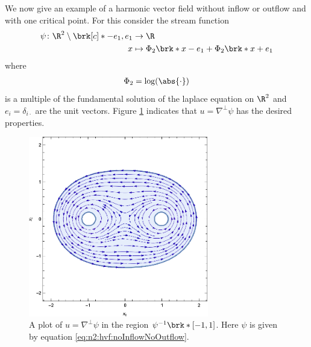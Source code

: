 We now give an example of a harmonic vector field without 
inflow or outflow and with one critical point.
For this consider the stream function
\begin{equation}
  \begin{aligned}
  \psi\colon\R^2\setminus\brk[c]*{-e_1,e_1}&\to\R \\
  x&\mapsto\Phi_2\brk*{x-e_1}+\Phi_2\brk*{x+e_1}
  \end{aligned}\label{eq:n2:hvf:noInflowNoOutflow}
\end{equation}
where
\begin{align*}
  \Phi_2=\log(\abs{\cdot})
\end{align*}
is a multiple of the fundamental solution of the laplace equation on $\R^2$ and $e_i=\delta_{i\cdot}$ are the unit vectors.
Figure \ref{pl:n2_hvf_noInflowNoOutflow} indicates that $u=\nabla^\perp\psi$ has the desired properties.
\begin{figure}
  \centering
  \includegraphics[width=0.7\textwidth]{../Plots/HarmonicVectorFields_gr1.eps}
  \caption{A plot of $u=\nabla^\perp\psi$ in the region $\psi^{-1}\brk*{[-1,1]}$.
    Here $\psi$ is given by equation \eqref{eq:n2:hvf:noInflowNoOutflow}.}
  \label{pl:n2_hvf_noInflowNoOutflow}
\end{figure}

